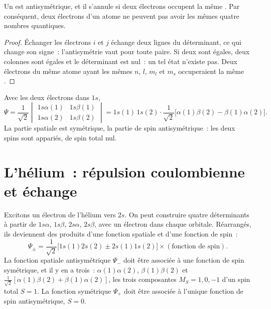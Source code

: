 \begin{theorem}\label{thm:b3:many-electron-atoms:pauli}
Un  est antisymétrique, et il s'annule si deux
électrons occupent la même . Par conséquent, deux électrons
d'un atome ne peuvent pas avoir les mêmes quatre nombres quantiques.
\end{theorem}

\begin{proof}
Échanger les électrons $i$ et $j$ échange deux lignes du déterminant, ce
qui change son signe~: l'antisymétrie vaut pour toute paire. Si deux
 sont égales, deux colonnes sont égales et le déterminant
est nul~: un tel état n'existe pas. Deux électrons du même atome ayant
les mêmes $n$, $l$,
$m_l$ et $m_s$ occuperaient la même .
\end{proof}

\begin{example}\label{ex:b3:many-electron-atoms:helium-ground}
Avec les deux électrons dans $1s$,
\[
\Psi = \frac{1}{\sqrt2}\begin{vmatrix}1s\alpha(1) & 1s\beta(1)\\ 1s\alpha(2) &
1s\beta(2)\end{vmatrix} = 1s(1)\,1s(2)\cdot\frac{1}{\sqrt2}\big[\alpha(1)\beta(2)
- \beta(1)\alpha(2)\big].
\]
La partie spatiale est symétrique, la partie de spin antisymétrique~: les
deux spins sont appariés, de spin total nul.
\end{example}

\section{L'hélium~: répulsion coulombienne et échange}

Excitons un électron de l'hélium vers $2s$. On peut construire quatre
déterminants à partir de
$1s\alpha$, $1s\beta$, $2s\alpha$, $2s\beta$, avec un électron dans chaque
orbitale. Réarrangés, ils deviennent des produits d'une fonction spatiale
et d'une fonction de spin~:
\[
\Psi_\pm = \frac{1}{\sqrt2}\big[1s(1)2s(2) \pm 2s(1)1s(2)\big]\times(\text{fonction
de spin}).
\]
La fonction spatiale antisymétrique $\Psi_-$ doit être associée à une
fonction de spin symétrique, et il y en a trois~: $\alpha(1)\alpha(2)$,
$\beta(1)\beta(2)$ et $\frac{1}{\sqrt2}[\alpha(1)\beta(2) + \beta(1)\alpha(2)]$,
les trois composantes $M_S = 1, 0, -1$ d'un spin total $S = 1$. La
fonction symétrique
$\Psi_+$ doit être associée à l'unique fonction de spin antisymétrique,
$S = 0$.

